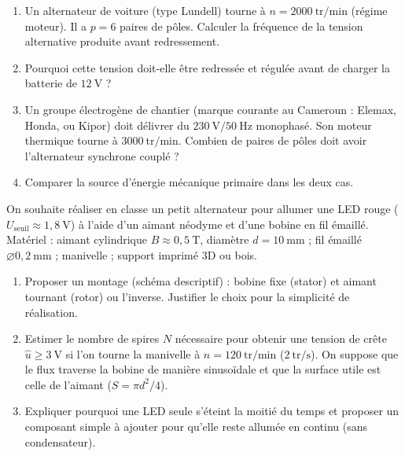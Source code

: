 \documentclass[11pt]{article}
\newcounter{popsec}
\newcounter{popsub}
\newcommand{\courssub}[1]{%
  \stepcounter{popsub}%
  \par\vspace{9pt}\noindent{\popxbold\fontsize{11.5}{13}\selectfont\color{popink}{\color{poporange}\thepopsec.\thepopsub}\hspace{6pt}#1}\par\nopagebreak\vspace{4pt}
}
\begin{document}
\begin{exercice}
\begin{enumerate}
    \item Un alternateur de voiture (type Lundell) tourne à $n = 2000~\text{tr/min}$ (régime moteur). Il a $p = 6$ paires de pôles. Calculer la fréquence de la tension alternative produite avant redressement.
    \item Pourquoi cette tension doit-elle être redressée et régulée avant de charger la batterie de $12~\text{V}$ ?
    \item Un groupe électrogène de chantier (marque courante au Cameroun : Elemax, Honda, ou Kipor) doit délivrer du $230~\text{V} / 50~\text{Hz}$ monophasé. Son moteur thermique tourne à $3000~\text{tr/min}$. Combien de paires de pôles doit avoir l'alternateur synchrone couplé ?
    \item Comparer la source d'énergie mécanique primaire dans les deux cas.
\end{enumerate}
\end{exercice}

\begin{exercice}
On souhaite réaliser en classe un petit alternateur pour allumer une LED rouge ($U_{\text{seuil}} \approx 1,8~\text{V}$) à l'aide d'un aimant néodyme et d'une bobine en fil émaillé.
Matériel : aimant cylindrique $B \approx 0,5~\text{T}$, diamètre $d = 10~\text{mm}$ ; fil émaillé $\varnothing 0,2~\text{mm}$ ; manivelle ; support imprimé 3D ou bois.
\begin{enumerate}
    \item Proposer un montage (schéma descriptif) : bobine fixe (stator) et aimant tournant (rotor) ou l'inverse. Justifier le choix pour la simplicité de réalisation.
    \item Estimer le nombre de spires $N$ nécessaire pour obtenir une tension de crête $\hat{u} \ge 3~\text{V}$ si l'on tourne la manivelle à $n = 120~\text{tr/min}$ ($2~\text{tr/s}$). On suppose que le flux traverse la bobine de manière sinusoïdale et que la surface utile est celle de l'aimant ($S = \pi d^2/4$).
    \item Expliquer pourquoi une LED seule s'éteint la moitié du temps et proposer un composant simple à ajouter pour qu'elle reste allumée en continu (sans condensateur).
\end{enumerate}
\end{exercice}

\courssub{Je me prépare au Probatoire}
\end{document}
